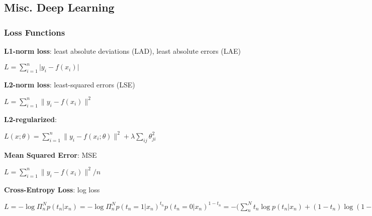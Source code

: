 \subsection*{Misc. Deep Learning}
\subsubsection*{Loss Functions}
\textbf{L1-norm loss}: least absolute deviations (LAD), least absolute errors (LAE) 

\tab $L=\sum^n_{i=1} \lvert y_i - f(x_i) \rvert$

\textbf{L2-norm loss}: least-squared errors (LSE)

\tab $L=\sum^n_{i=1} \lVert y_i - f(x_i) \rVert^2$

\textbf{L2-regularized}:

\tab $L(x;\theta)=\sum^n_{i=1} \lVert y_i - f(x_i;\theta) \rVert^2 + \lambda\sum_{ij}\theta_{ji}^2$

\textbf{Mean Squared Error}: MSE

\tab $L=\sum^n_{i=1} \lVert y_i - f(x_i) \rVert^2 / n$

\textbf{Cross-Entropy Loss}: log loss

$L=-\log\Pi^N_n p(t_n|x_n)=-\log\Pi^N_n p(t_n=1|x_n)^{t_n} p(t_n=0|x_n)^{1-t_n}=-\bigr(\sum^N_n t_n \log p(t_n|x_n) + (1-t_n) \log (1-p(t_n|x_n))\bigr)$






